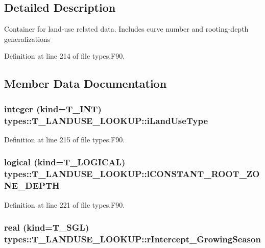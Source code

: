 \subsection{Detailed Description}
Container for land-\/use related data. Includes curve number and rooting-\/depth generalizations 

Definition at line 214 of file types.F90.



\subsection{Member Data Documentation}
\hypertarget{typetypes_1_1_t___l_a_n_d_u_s_e___l_o_o_k_u_p_ab7443cbed68b298e42f0b4fb2c3f65d4}{
\subsubsection[{iLandUseType}]{\setlength{\rightskip}{0pt plus 5cm}integer (kind={\bf T\_\-INT}) {\bf types::T\_\-LANDUSE\_\-LOOKUP::iLandUseType}}}
\label{typetypes_1_1_t___l_a_n_d_u_s_e___l_o_o_k_u_p_ab7443cbed68b298e42f0b4fb2c3f65d4}


Definition at line 215 of file types.F90.

\hypertarget{typetypes_1_1_t___l_a_n_d_u_s_e___l_o_o_k_u_p_afe57d2ed9ca6c4e1f014f8cdfb969b24}{
\subsubsection[{lCONSTANT\_\-ROOT\_\-ZONE\_\-DEPTH}]{\setlength{\rightskip}{0pt plus 5cm}logical (kind={\bf T\_\-LOGICAL}) {\bf types::T\_\-LANDUSE\_\-LOOKUP::lCONSTANT\_\-ROOT\_\-ZONE\_\-DEPTH}}}
\label{typetypes_1_1_t___l_a_n_d_u_s_e___l_o_o_k_u_p_afe57d2ed9ca6c4e1f014f8cdfb969b24}


Definition at line 221 of file types.F90.

\hypertarget{typetypes_1_1_t___l_a_n_d_u_s_e___l_o_o_k_u_p_a656493381912c76f42c21e501b27f9dc}{
\subsubsection[{rIntercept\_\-GrowingSeason}]{\setlength{\rightskip}{0pt plus 5cm}real (kind={\bf T\_\-SGL}) {\bf types::T\_\-LANDUSE\_\-LOOKUP::rIntercept\_\-GrowingSeason}}}
\label{typetypes_1_1_t___l_a_n_d_u_s_e___l_o_o_k_u_p_a656493381912c76f42c21e501b27f9dc}


